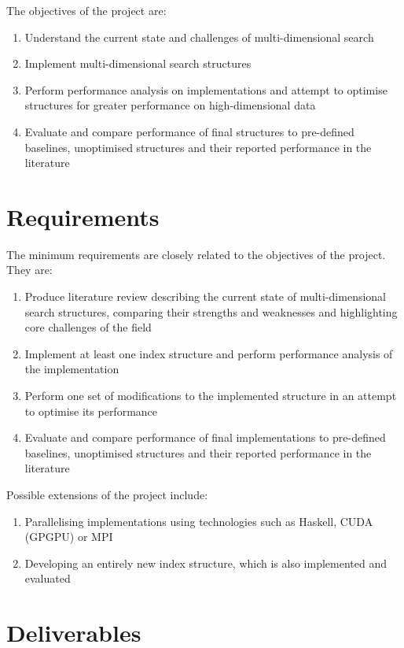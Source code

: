 The objectives of the project are:
\begin{enumerate}
	\item Understand the current state and challenges of multi-dimensional search
	\item Implement multi-dimensional search structures
	\item Perform performance analysis on implementations and attempt to optimise structures for greater performance on high-dimensional data
	\item Evaluate and compare performance of final structures to pre-defined baselines, unoptimised structures and their reported performance in the literature
\end{enumerate}

\section{Requirements}
\label{sec:requirements}

The minimum requirements are closely related to the objectives of the project. They are:
\begin{enumerate}
	\item Produce literature review describing the current state of multi-dimensional search structures, comparing their strengths and weaknesses and highlighting core challenges of the field
	\item Implement at least one index structure and perform performance analysis of the implementation
	\item Perform one set of modifications to the implemented structure in an attempt to optimise its performance
	\item Evaluate and compare performance of final implementations to pre-defined baselines, unoptimised structures and their reported performance in the literature
\end{enumerate}

Possible extensions of the project include:
\begin{enumerate}
	\item Parallelising implementations using technologies such as Haskell, CUDA (GPGPU) or MPI
	\item Developing an entirely new index structure, which is also implemented and evaluated
\end{enumerate}

\section{Deliverables}
\label{sec:deliverables}

